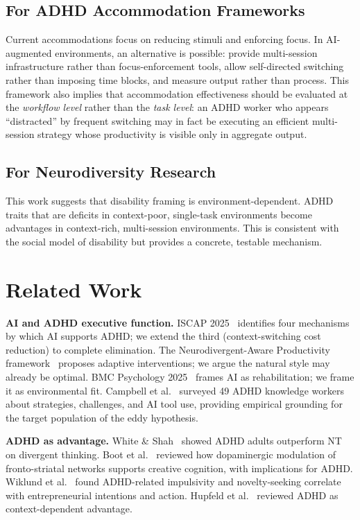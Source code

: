 \documentclass[sigconf,nonacm]{acmart}
\begin{document}
\subsection{For ADHD Accommodation Frameworks}

Current accommodations focus on reducing stimuli and enforcing focus. In AI-augmented environments, an alternative is possible: provide multi-session infrastructure rather than focus-enforcement tools, allow self-directed switching rather than imposing time blocks, and measure output rather than process. This framework also implies that accommodation effectiveness should be evaluated at the \emph{workflow level} rather than the \emph{task level}: an ADHD worker who appears ``distracted'' by frequent switching may in fact be executing an efficient multi-session strategy whose productivity is visible only in aggregate output.

\subsection{For Neurodiversity Research}

This work suggests that disability framing is environment-dependent. ADHD traits that are deficits in context-poor, single-task environments become advantages in context-rich, multi-session environments. This is consistent with the social model of disability but provides a concrete, testable mechanism.

\section{Related Work}

\textbf{AI and ADHD executive function.} ISCAP 2025~\cite{iscap2025} identifies four mechanisms by which AI supports ADHD; we extend the third (context-switching cost reduction) to complete elimination. The Neurodivergent-Aware Productivity framework~\cite{arxiv2507} proposes adaptive interventions; we argue the natural style may already be optimal. BMC Psychology 2025~\cite{bmc2025} frames AI as rehabilitation; we frame it as environmental fit. Campbell et al.~\cite{campbell2024} surveyed 49 ADHD knowledge workers about strategies, challenges, and AI tool use, providing empirical grounding for the target population of the eddy hypothesis.

\textbf{ADHD as advantage.} White \& Shah~\cite{white2011} showed ADHD adults outperform NT on divergent thinking. Boot et al.~\cite{boot2017} reviewed how dopaminergic modulation of fronto-striatal networks supports creative cognition, with implications for ADHD. Wiklund et al.~\cite{wiklund2017} found ADHD-related impulsivity and novelty-seeking correlate with entrepreneurial intentions and action. Hupfeld et al.~\cite{hupfeld2019} reviewed ADHD as context-dependent advantage.
\end{document}

